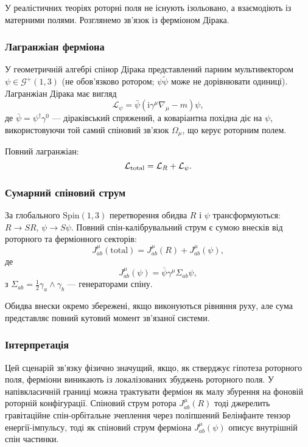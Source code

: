 \documentclass[11pt,a4paper]{article}
\numberwithin{equation}{section}
\theoremstyle{plain}
\theoremstyle{definition}
\theoremstyle{remark}
\newcommand{\ii}{\mathrm{i}}
\begin{document}
У реалістичних теоріях роторні поля не існують ізольовано, а взаємодіють із матерними полями. Розглянемо зв'язок із ферміоном Дірака.

\subsubsection{Лагранжіан ферміона}

У геометричній алгебрі спінор Дірака представлений парним мультивектором $\psi \in \mathcal{G}^+(1,3)$ (не обов'язково ротором; $\psi\widetilde{\psi}$ може не дорівнювати одиниці). Лагранжіан Дірака має вигляд
\begin{equation}
\mathcal{L}_\psi = \bar{\psi}(\ii\gamma^\mu\nabla_\mu - m)\psi,
\end{equation}
де $\bar{\psi} = \psi^\dagger\gamma^0$ — діраківський спряжений, а коваріантна похідна діє на $\psi$, використовуючи той самий спіновий зв'язок $\Omega_\mu$, що керує роторним полем.

Повний лагранжіан:
\begin{equation}
\mathcal{L}_{\rm total} = \mathcal{L}_R + \mathcal{L}_\psi.
\end{equation}

\subsubsection{Сумарний спіновий струм}

За глобального $\mathrm{Spin}(1,3)$ перетворення обидва $R$ і $\psi$ трансформуються: $R \to SR$, $\psi \to S\psi$. Повний спін-калібрувальний струм є сумою внесків від роторного та ферміонного секторів:
\begin{equation}
J^\mu_{ab}(\text{total}) = J^\mu_{ab}(R) + J^\mu_{ab}(\psi),
\end{equation}
де
\begin{equation}
J^\mu_{ab}(\psi) = \bar{\psi}\gamma^\mu\Sigma_{ab}\psi,
\end{equation}
з $\Sigma_{ab} = \frac{1}{2}\gamma_a\wedge\gamma_b$ — генераторами спіну.

Обидва внески окремо збережені, якщо виконуються рівняння руху, але сума представляє повний кутовий момент зв'язаної системи.

\subsubsection{Інтерпретація}

Цей сценарій зв'язку фізично значущий, якщо, як стверджує гіпотеза роторного поля, ферміони виникають із локалізованих збуджень роторного поля. У напівкласичній границі можна трактувати ферміон як малу збурення на фоновій роторній конфігурації. Спіновий струм ротора $J^\mu_{ab}(R)$ тоді джерелить гравітаційне спін-орбітальне зчеплення через поліпшений Белінфанте тензор енергії-імпульсу, тоді як спіновий струм ферміона $J^\mu_{ab}(\psi)$ описує внутрішній спін частинки.
\end{document}
